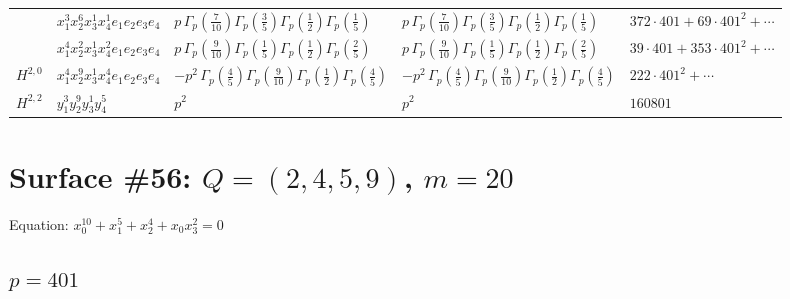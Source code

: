 \documentclass[11pt]{article}
\begin{document}
\begin{table}[ht]
{\begin{tabular}{@{}lllll@{}}
 & $x_{1}^{3} x_{2}^{6} x_{3}^{1} x_{4}^{1}  e_{1} e_{2} e_{3} e_{4}$ & $p \, \Gamma_p \left( \frac{7}{10} \right) \Gamma_p \left( \frac{3}{5} \right) \Gamma_p \left( \frac{1}{2} \right) \Gamma_p \left( \frac{1}{5} \right)$ & $p \, \Gamma_p \left( \frac{7}{10} \right) \Gamma_p \left( \frac{3}{5} \right) \Gamma_p \left( \frac{1}{2} \right) \Gamma_p \left( \frac{1}{5} \right)$ & $372{\cdot}401{+}69{\cdot}401^{2}{+}\cdots$ \\
 & $x_{1}^{4} x_{2}^{2} x_{3}^{1} x_{4}^{2}  e_{1} e_{2} e_{3} e_{4}$ & $p \, \Gamma_p \left( \frac{9}{10} \right) \Gamma_p \left( \frac{1}{5} \right) \Gamma_p \left( \frac{1}{2} \right) \Gamma_p \left( \frac{2}{5} \right)$ & $p \, \Gamma_p \left( \frac{9}{10} \right) \Gamma_p \left( \frac{1}{5} \right) \Gamma_p \left( \frac{1}{2} \right) \Gamma_p \left( \frac{2}{5} \right)$ & $39{\cdot}401{+}353{\cdot}401^{2}{+}\cdots$ \\
\midrule
$H^{2,0}$ & $x_{1}^{4} x_{2}^{9} x_{3}^{1} x_{4}^{4}  e_{1} e_{2} e_{3} e_{4}$ & $- p^{2} \, \Gamma_p \left( \frac{4}{5} \right) \Gamma_p \left( \frac{9}{10} \right) \Gamma_p \left( \frac{1}{2} \right) \Gamma_p \left( \frac{4}{5} \right)$ & $- p^{2} \, \Gamma_p \left( \frac{4}{5} \right) \Gamma_p \left( \frac{9}{10} \right) \Gamma_p \left( \frac{1}{2} \right) \Gamma_p \left( \frac{4}{5} \right)$ & $222{\cdot}401^{2}{+}\cdots$ \\
\midrule
$H^{2,2}$ & $y_{1}^{3} y_{2}^{9} y_{3}^{1} y_{4}^{5}$ & $p^{2} \,$ & $p^{2} \,$ & $160801$ \\
\bottomrule
\end{tabular}
}
\renewcommand{\arraystretch}{1.0}
\end{table}

\newpage

\section*{Surface \#56: $Q=(2, 4, 5, 9)$, $m=20$}

Equation: $x_0^{10} + x_1^{5} + x_2^{4} + x_0 x_3^{2} = 0$

\subsection*{$p = 401$}
\end{document}

